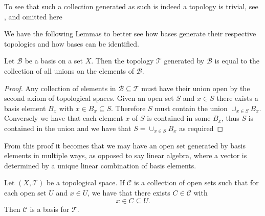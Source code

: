 To see that such a collection generated as such is indeed a topology
is trivial, see  \cite[p.~79]{munkres}, and omitted here

We have the following Lemmas to better see how bases generate their
respective topologies and how bases can be identified.

\begin{lem}
  \label{lem:union}
  Let $\mathscr{B}$ be a basis on a set $X$. Then the topology
  $\mathscr{T}$ generated by $\mathscr{B}$ is equal to the collection
  of all unions on the elements of $\mathscr{B}$.
\end{lem}

\begin{proof}
  Any collection of elements in $\mathscr{B} \subseteq \mathscr{T}$
  must have their union open by the second axiom of topological
  spaces. Given an open set $S$ and $x \in S$ there exists a basis
  element $B_x$ with $x \in B_x \subseteq S$. Therefore $S$ must
  contain the union $\cup_{x \in S} B_x$. Conversely we have that each
  element $x$ of $S$ is contained in some $B_x$, thus $S$ is contained
  in the union and we have that $S = \cup_{x \in S} B_x$ as required
\end{proof}

From this proof it becomes that we may have an open set generated by
basis elements in multiple ways, as opposed to say linear algebra,
where a vector is determined by a unique linear combination of basis
elements.

\begin{lem}
  \label{lem:collection}
  Let $(X,\mathscr{T})$ be a topological space. If $\mathscr{C}$ is a
  collection of open sets such that for each open set $U$ and $x \in
  U$, we have that there exists $C \in \mathscr{C}$ with 
  \[
    x \in C \subseteq U.
  \]
  Then $\mathscr{C}$ is a basis for $\mathscr{T}$.
\end{lem}

